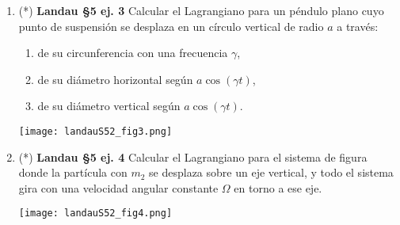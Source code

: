 \documentclass[11pt,spanish,a4paper]{article}
\begin{document}
\begin{enumerate}
\item \begin{minipage}[t][4.5cm]{0.7\textwidth}
(*) \textbf{Landau \S5 ej. 3}
Calcular el Lagrangiano para un péndulo plano cuyo punto de suspensión se desplaza  en un círculo vertical de radio \(a\) a través:
\begin{enumerate}
\item de su circunferencia con una frecuencia \(\gamma\),
\item de su diámetro horizontal según \(a \cos{(\gamma t)}\),
\item de su  diámetro vertical según \(a \cos{(\gamma t)}\).
\end{enumerate}
\end{minipage}
	\begin{minipage}[c][2.5cm][t]{0.3\textwidth}
	\texttt{[image: landauS52\_fig3.png]}
\end{minipage}



\item \begin{minipage}[t][4.5cm]{0.7\textwidth}
(*) \textbf{Landau \S5 ej. 4}
	Calcular el Lagrangiano para el sistema de figura donde la partícula con \(m_2\) se desplaza sobre un eje vertical, y todo el sistema gira con una velocidad angular constante \(\Omega\) en torno a ese eje.
\end{minipage}
	\begin{minipage}[c][2.5cm][t]{0.3\textwidth}
	\texttt{[image: landauS52\_fig4.png]}
\end{minipage}



\end{enumerate}
\end{document}
